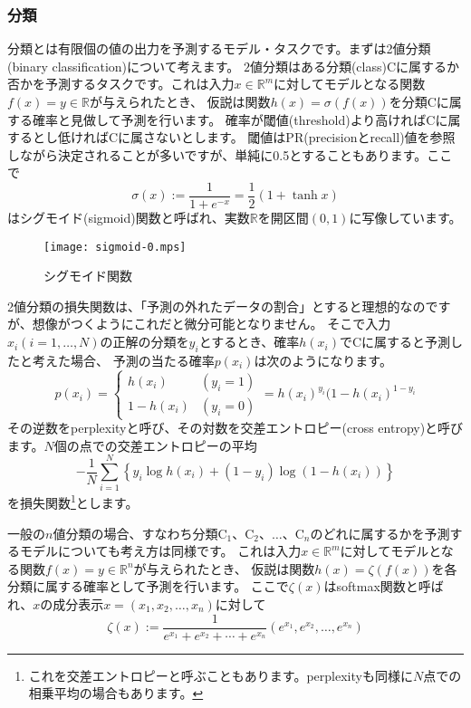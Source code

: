\documentclass[a4j]{jarticle}
\newcommand{\R}[0]{\mathbb{R}}
\begin{document}
\subsubsection{分類}
分類とは有限個の値の出力を予測するモデル・タスクです。まずは2値分類(binary classification)について考えます。
$2$値分類はある分類(class)Cに属するか否かを予測するタスクです。これは入力$x\in\R^m$に対してモデルとなる関数$f(x)=y\in\R$が与えられたとき、
仮説は関数$h(x)=σ(f(x))$を分類Cに属する確率と見做して予測を行います。
確率が閾値(threshold)より高ければCに属するとし低ければCに属さないとします。
閾値はPR(precisionとrecall)値を参照しながら決定されることが多いですが、単純に0.5とすることもあります。ここで
$$\sigma(x) := \frac1{1+e^{-x}} = \frac12(1+\tanh x)$$
はシグモイド(sigmoid)関数と呼ばれ、実数$\R$を開区間$(0,1)$に写像しています。
\begin{figure}[h]
  \centering
  \texttt{[image: sigmoid-0.mps]}
\caption{シグモイド関数}
\end{figure}

2値分類の損失関数は、「予測の外れたデータの割合」とすると理想的なのですが、想像がつくようにこれだと微分可能となりません。
そこで入力$x_i  (i=1,\ldots,N)$の正解の分類を$y_i$とするとき、確率$h(x_i)$でCに属すると予測したと考えた場合、
予測の当たる確率$p(x_i)$は次のようになります。
$$ p(x_i) = \begin{cases} h(x_i) & (y_i=1)\\ 1-h(x_i) & (y_i=0)\end{cases}=h(x_i)^{y_i}(1-h(x_i)^{1-y_i}$$
その逆数をperplexityと呼び、その対数を交差エントロピー(cross entropy)と呼びます。$N$個の点での交差エントロピーの平均
$$-\frac1N\sum_{i=1}^N \left\{y_i\log h(x_i)+(1-y_i)\log(1-h(x_i))\right\}$$
を損失関数\footnote{これを交差エントロピーと呼ぶこともあります。perplexityも同様に$N$点での相乗平均の場合もあります。}とします。


一般の$n$値分類の場合、すなわち分類C$_1$、C$_2$、$\ldots$、C$_n$のどれに属するかを予測するモデルについても考え方は同様です。
これは入力$x\in\R^m$に対してモデルとなる関数$f(x)=y\in\R^n$が与えられたとき、
仮説は関数$h(x)=\zeta(f(x))$を各分類に属する確率として予測を行います。
ここで$\zeta(x)$はsoftmax関数と呼ばれ、$x$の成分表示$x=(x_1,x_2,\ldots,x_n)$に対して
$$\zeta(x) :=\frac1{e^{x_1}+e^{x_2}+\cdots+e^{x_n}}(e^{x_1},e^{x_2},\ldots,e^{x_n})$$
\end{document}
